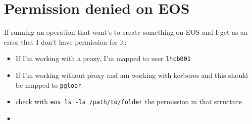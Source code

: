 \documentclass{article}
\begin{document}
\section{Permission denied on EOS}

If running an operation that want's to create something on EOS and I get as an error that I don't have permission for it:

\begin{itemize}
\item If I'm working with a proxy, I'm mapped to user \texttt{lhcb001}
\item If I'm working without proxy and am working with kerberos and this should be mapped to \texttt{pgloor}
\item check with \texttt{eos ls -la /path/to/folder} the permission in that structure
\item 
\end{itemize}
\end{document}

